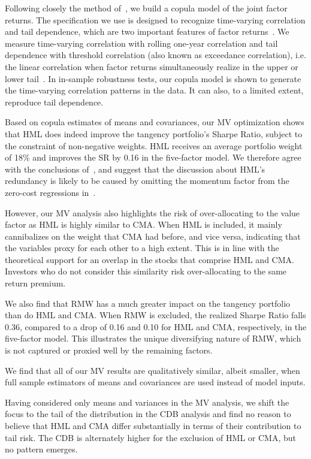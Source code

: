 Following closely the method of~\textcite{ChristoffersenLanglois2013}, we build a copula model of the joint factor returns. The specification we use is designed to recognize time-varying correlation and tail dependence, which are two important features of factor returns~\autocite{ChristoffersenLanglois2013}. We measure time-varying correlation with rolling one-year correlation and tail dependence with threshold correlation (also known as exceedance correlation), i.e. the linear correlation when factor returns simultaneously realize in the upper or lower tail~\autocite{AngChen2002}. In in-sample robustness tests, our copula model is shown to generate the time-varying correlation patterns in the data. It can also, to a limited extent, reproduce tail dependence.

Based on copula estimates of means and covariances, our MV optimization shows that HML does indeed improve the tangency portfolio's Sharpe Ratio, subject to the constraint of non-negative weights. HML receives an average portfolio weight of 18\% and improves the SR by 0.16 in the five-factor model. We therefore agree with the conclusions of~\textcite{Asness2015}, and suggest that the discussion about HML's redundancy is likely to be caused by omitting the momentum factor from the zero-cost regressions in~\textcite{FF2015}.

However, our MV analysis also highlights the risk of over-allocating to the value factor as HML is highly similar to CMA. When HML is included, it mainly cannibalizes on the weight that CMA had before, and vice versa, indicating that the variables proxy for each other to a high extent. This is in line with the theoretical support for an overlap in the stocks that comprise HML and CMA. Investors who do not consider this similarity risk over-allocating to the same return premium.

We also find that RMW has a much greater impact on the tangency portfolio than do HML and CMA. When RMW is excluded, the realized Sharpe Ratio falls 0.36, compared to a drop of 0.16 and 0.10 for HML and CMA, respectively, in the five-factor model. This illustrates the unique diversifying nature of RMW, which is not captured or proxied well by the remaining factors.

We find that all of our MV results are qualitatively similar, albeit smaller, when full sample estimators of means and covariances are used instead of model inputs.

Having considered only means and variances in the MV analysis, we shift the focus to the tail of the distribution in the CDB analysis and find no reason to believe that HML and CMA differ substantially in terms of their contribution to tail risk. The CDB is alternately higher for the exclusion of HML or CMA, but no pattern emerges. 

